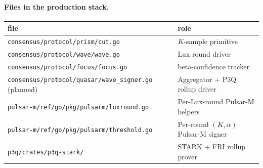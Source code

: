 \paragraph{Files in the production stack.}
\begin{center}\small
\begin{tabular}{l l}
\toprule
file & role \\
\midrule
\texttt{consensus/protocol/prism/cut.go} & $K$-sample primitive \\
\texttt{consensus/protocol/wave/wave.go} & Lux round driver \\
\texttt{consensus/protocol/focus/focus.go} & beta-confidence tracker \\
\texttt{consensus/protocol/quasar/wave\_signer.go} (planned) & Aggregator + P3Q rollup driver \\
\texttt{pulsar-m/ref/go/pkg/pulsarm/luxround.go} & Per-Lux-round Pulsar-M helpers \\
\texttt{pulsar-m/ref/go/pkg/pulsarm/threshold.go} & Per-round $(K, \alpha)$ Pulsar-M signer \\
\texttt{p3q/crates/p3q-stark/} & STARK + FRI rollup prover \\
\bottomrule
\end{tabular}
\end{center}
